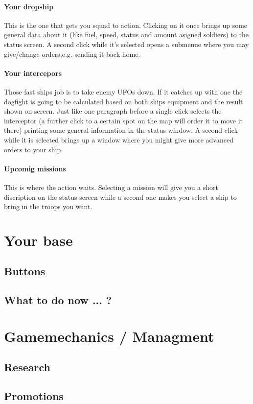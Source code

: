 \paragraph*{Your dropship}
This is the one that gets you squad to action. Clicking on it once brings up some general data about it (like fuel, speed, status and amount asigned soldiers) to the status screen. A second click while it's selected opens a submenue where you may give/change orders,e.g. sending it back home.
\paragraph*{Your intercepors}
Those fast ships job is to take enemy UFOs down. If it catches up with one the dogfight is going to be calculated based on both ships equipment and the result shown on screen. Just like one paragraph before a single click selects the interceptor (a further click to a certain spot on the map will order it to move it there) printing some general information in the status window. A second click while it is selected brings up a window where you might give more advanced orders to your ship.
\paragraph*{Upcomig missions}
This is where the action waits. Selecting a mission will give you a short discription on the status screen while a second one makes you select a ship to bring in the troops you want.


\section{Your base}
\subsection{Buttons}
\subsection{What to do now ... ?}

\section{Gamemechanics / Managment}
\subsection{Research}
\subsection{Promotions}